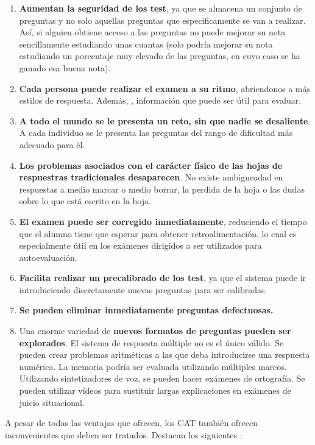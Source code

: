 \begin{enumerate}
	\item \textbf{Aumentan la seguridad de los test}, ya que se almacena un conjunto de preguntas y no solo aquellas preguntas que especificamente se van a realizar. Así, si alguien obtiene acceso a las preguntas no puede mejorar su nota sencillamente estudiando unas cuantas (solo podría mejorar su nota estudiando un porcentaje muy elevado de las preguntas, en cuyo caso se ha ganado esa buena nota).
	\item \textbf{Cada persona puede realizar el examen a su ritmo}, abriendonos a más estilos de respuesta. Además, , información que puede ser útil para evaluar.
	\item \textbf{A todo el mundo se le presenta un reto, sin que nadie se desaliente}. A cada individuo se le presenta las preguntas del rango de dificultad más adecuado para él.
	\item \textbf{Los problemas asociados con el carácter físico de las hojas de respuestras tradicionales desaparecen}. No existe ambigueadad en respuestas a medio marcar o medio borrar, la perdida de la hoja o las dudas sobre lo que está escrito en la hoja.
	\item \textbf{El examen puede ser corregido inmediatamente}, reduciendo el tiempo que el alumno tiene que esperar para obtener retroalimentación, lo cual es especialmente útil en los exámenes dirigidos a ser utilizados para autoevaluación.
	\item \textbf{Facilita realizar un precalibrado de los test}, ya que el sistema puede ir introduciendo discretamente nuevas preguntas para ser calibradas.
	\item \textbf{Se pueden eliminar inmediatamente preguntas defectuosas.}
	\item Una enorme variedad de \textbf{nuevos formatos de preguntas pueden ser explorados}. El sistema de respuesta múltiple no es el único válido. Se pueden crear problemas aritméticas a las que deba introducirse una respuesta numérica. La memoria podría ser evaluada utilizando múltiples marcos. Utilizando sintetizadores de voz, se pueden hacer exámenes de ortografía. Se pueden utilizar vídeos para sustituir largas explicaciones en exámenes de juicio situacional.
\end{enumerate}

A pesar de todas las ventajas que ofrecen, los \acrshort{CAT} también ofrecen inconvenientes que deben ser tratados. Destacan los siguientes \cite{Wainer00}:

